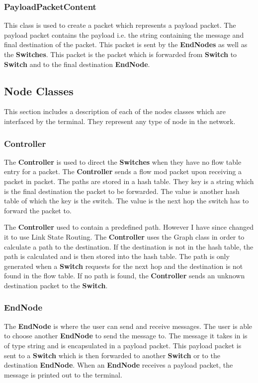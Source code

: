 \documentclass{article}
\begin{document}
\subsubsection{PayloadPacketContent}
This class is used to create a packet which represents a payload packet. The
payload packet contains the payload i.e. the string containing the message and
final destination of the packet. This packet is sent by the \textbf{EndNodes}
as well as the \textbf{Switches}. This packet is the packet which is forwarded
from \textbf{Switch} to \textbf{Switch} and to the final destination
\textbf{EndNode}.

\subsection{Node Classes}
This section includes a description of each of the nodes classes which are
interfaced by the terminal. They represent any type of node in the network.

\subsubsection{Controller}
The \textbf{Controller} is used to direct the \textbf{Switches} when they have
no flow table entry for a packet. The \textbf{Controller} sends a flow mod
packet upon receiving a packet in packet. The paths are stored in a hash table.
They key is a string which is the final destination the packet to be forwarded.
The value is another hash table of which the key is the switch. The value is the
next hop the switch has to forward the packet to.

The \textbf{Controller} used to contain a predefined path. However I have since
changed it to use Link State Routing. The \textbf{Controller} uses the Graph
class in order to calculate a path to the destination. If the destination is not
in the hash table, the path is calculated and is then stored into the hash table.
The path is only generated when a \textbf{Switch} requests for the next hop and
the destination is not found in the flow table. If no path is found, the
\textbf{Controller} sends an unknown destination packet to the \textbf{Switch}.

\subsubsection{EndNode}
The \textbf{EndNode} is where the user can send and receive messages. The user
is able to choose another \textbf{EndNode} to send the message to. The message
it takes in is of type string and is encapsulated in a payload packet. This
payload packet is sent to a \textbf{Switch} which is then forwarded to another
\textbf{Switch} or to the destination \textbf{EndNode}. When an \textbf{EndNode}
receives a payload packet, the message is printed out to the terminal.
\end{document}
